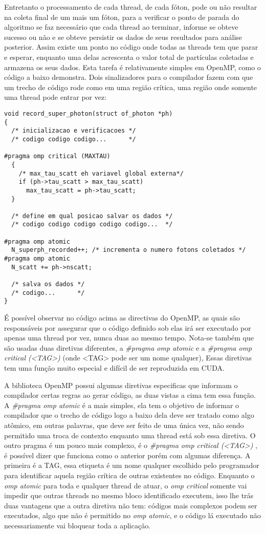     Entretanto o processamento de cada thread, de cada fóton, pode ou não resultar na coleta final de um mais um fóton, para a verificar o ponto de parada do algoritmo se faz necessário que cada thread ao terminar, informe se obteve sucesso ou não e se obteve persistir os dados de seus resultados para análise posterior. Assim existe um ponto no código onde todas as threads tem que parar e esperar, enquanto uma delas acrescenta o valor total de partículas coletadas e armazena os seus dados. Esta tarefa é relativamente simples em OpenMP, como o código a baixo demonstra. Dois sinalizadores para o compilador fazem com que um trecho de código rode como em uma região crítica, uma região onde somente uma thread pode entrar por vez:

    \begin{lstlisting}
void record_super_photon(struct of_photon *ph)
{
  /* inicializacao e verificacoes */
  /* codigo codigo codigo...      */

#pragma omp critical (MAXTAU)
  {
    /* max_tau_scatt eh variavel global externa*/
    if (ph->tau_scatt > max_tau_scatt)
      max_tau_scatt = ph->tau_scatt;
  }

  /* define em qual posicao salvar os dados */
  /* codigo codigo codigo codigo codigo...  */

#pragma omp atomic
  N_superph_recorded++; /* incrementa o numero fotons coletados */
#pragma omp atomic
  N_scatt += ph->nscatt;

  /* salva os dados */
  /* codigo...      */
}
    \end{lstlisting}

    É possível observar no código acima as directivas do OpenMP, as quais são responsáveis por assegurar que o código definido sob elas irá ser executado por apenas uma thread por vez, nunca duas ao mesmo tempo. Nota-se também que são usadas duas diretivas diferentes, a \textit{\#pragma omp atomic} e a \textit{\#pragma omp critical (<TAG>) } (onde <TAG> pode ser um nome qualquer), Essas diretivas tem uma função muito especial e difícil de ser reproduzida em CUDA.

    A biblioteca OpenMP possui algumas diretivas especificas que informam o compilador certas regras ao gerar código, as duas vistas a cima tem essa função. A \textit{\#pragma omp atomic} é a mais simples, ela tem o objetivo de informar o compilador que o trecho de código logo a baixo dela deve ser tratado como algo atômico, em outras palavras, que deve ser feito de uma única vez, não sendo permitido uma troca de contexto enquanto uma thread está sob essa diretiva. O outro pragma é um pouco mais complexo, é o \textit{\#pragma omp critical (<TAG>) }, é possível  dizer que funciona como o anterior porém com algumas diferença. A primeira é a TAG, essa etiqueta é um nome qualquer escolhido pelo programador para identificar aquela região crítica de outras existentes no código. Enquanto o \textit{omp atomic} para toda e qualquer thread de atuar, o \textit{omp critical} somente vai impedir que outras threads no mesmo bloco identificado executem, isso lhe trás duas vantagens que a outra diretiva não tem: códigos mais complexos podem ser executados, algo que não é permitido no \textit{omp atomic}, e o código lá executado não necessariamente vai bloquear toda a aplicação.

